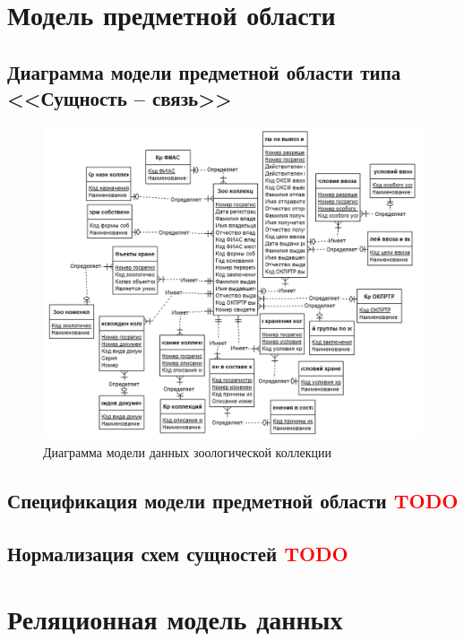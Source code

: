 \documentclass[10pt, a4paper, titlepage]{article}
\begin{document}
\section{Модель предметной области}

\subsection{Диаграмма модели предметной области типа <<Сущность -- связь>>}

\begin{figure}[H]
    \centering
    \includegraphics[width=.9\columnwidth]{image.png}
    \caption{Диаграмма модели данных зоологической коллекции}
    \label{fig:er_diagram}
\end{figure}

\subsection{Спецификация модели предметной области \textcolor{red}{TODO}}







\subsection{Нормализация схем сущностей \textcolor{red}{TODO}}



\section{Реляционная модель данных}
\end{document}
